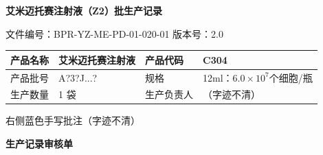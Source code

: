 \documentclass[UTF8,10pt,a4paper,fontset=fandol]{ctexart}
\newcommand{\fieldvalue}[1]{#1}
\newcommand{\handwritten}[1]{#1}
\begin{document}
\newpage

\begin{center}
\textbf{艾米迈托赛注射液（Z2）批生产记录}
\end{center}

\noindent
文件编号：BPR-YZ-ME-PD-01-020-01 \qquad 版本号：2.0

\begin{tabularx}{\textwidth}{|p{2.2cm}|X|p{2.2cm}|X|}
\hline
产品名称 & 艾米迈托赛注射液 & 产品代码 & C304 \\
\hline
产品批号 &
\fieldvalue{\handwritten{A?3?J...?}} &
规格 & 12ml：$6.0 \times 10^{7}$个细胞/瓶 \\
\hline
生产数量 &
\fieldvalue{\handwritten{1}} 袋 &
生产负责人 &
\fieldvalue{\handwritten{（字迹不清）}} \\
\hline
\end{tabularx}

\handwritten{右侧蓝色手写批注（字迹不清）}

\begin{center}
\textbf{生产记录审核单}
\end{center}
\end{document}
